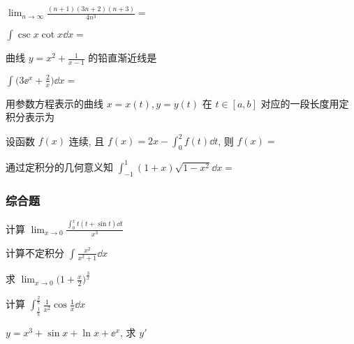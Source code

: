 \begin{ti}[3 分]
	$\lim_{n \to \infty} \frac{(n + 1)(3n + 2)(n + 3)}{4 n^{3}} = $ \hua
\end{ti}

\begin{ti}[3 分]
	$\int \csc x \cot x \dd{x} = $ \hua
\end{ti}

\begin{ti}[3 分]
	曲线 $y = x^{2} + \frac{1}{x - 1}$ 的铅直渐近线是 \hua
\end{ti}

\begin{ti}[3 分]
	$\int \bigl( 3 \ee^{x} + \frac{2}{x} \bigr) \dd{x} = $ \hua
\end{ti}

\begin{ti}[3 分]
	用参数方程表示的曲线 $x = x(t), y = y(t)$ 在 $t \in [a,b]$ 对应的一段长度用定积分表示为 \hua
\end{ti}

\begin{ti}[3 分]
	设函数 $f(x)$ 连续, 且 $f(x) = 2x - \int_{0}^{2} f(t) \dd{t}$, 则 $f(x) = $ \hua
\end{ti}

\begin{ti}[3 分]
	通过定积分的几何意义知 $\int_{-1}^{1} (1 + x) \sqrt{1 - x^{2}} \dd{x} = $ \hua
\end{ti}

\subsubsection{综合题}
\begin{ti}[6 分]
	计算 $\lim_{x \to 0} \frac{\int_{0}^{x} t(t + \sin t) \dd{t}}{x^{3}}$
\end{ti}

\begin{ti}[5 分]
	计算不定积分 $\int \frac{x^{2}}{x^{2} + 1} \dd{x}$
\end{ti}

\begin{ti}[6 分]
	求 $\lim_{x \to 0} \bigl( 1 + \frac{x}{2} \bigr)^{\frac{3}{x}}$
\end{ti}

\begin{ti}[6 分]
	计算 $\int_{\frac{1}{\uppi}}^{\frac{2}{\uppi}} \frac{1}{x^{2}} \cos \frac{1}{x} \dd{x}$
\end{ti}

\begin{ti}[6 分]
	$y = x^{3} + \sin x + \ln x + \ee^{x}$, 求 $y'$
\end{ti}

